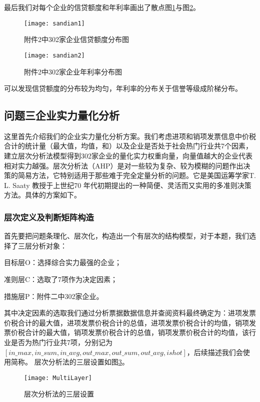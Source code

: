 \documentclass{cumcmthesis}
\begin{document}
    最后我们对每个企业的信贷额度和年利率画出了散点图\ref{sandian1}与图\ref{sandian2}。
    \begin{figure}[H]
        \centering
        \texttt{[image: sandian1]}
        \caption{附件2中302家企业信贷额度分布图}
        \label{sandian1}
    \end{figure}

    \begin{figure}[H]
        \centering
        \texttt{[image: sandian2]}
        \caption{附件2中302家企业年利率分布图}
        \label{sandian2}
    \end{figure}
    可以发现信贷额度的分布较为均匀，年利率的分布关于信誉等级成阶梯分布。

\subsection{问题三企业实力量化分析}
这里首先介绍我们的企业实力量化分析方案。我们考虑进项和销项发票信息中价税合计的统计量（最大值，均值，和）以及企业是否处于社会热门行业共7个因素，建立层次分析法模型得到302家企业的量化实力权重向量，向量值越大的企业代表相对实力越强。层次分析法（AHP）是对一些较为复杂、较为模糊的问题作出决策的简易方法，它特别适用于那些难于完全定量分析的问题。它是美国运筹学家T. L. Saaty 教授于上世纪70 年代初期提出的一种简便、灵活而又实用的多准则决策方法。具体的方案如下。



\subsubsection{层次定义及判断矩阵构造}
首先要把问题条理化、层次化，构造出一个有层次的结构模型，对于本题，我们选择了三层分析对象：

目标层O：选择综合实力最强的企业；

准则层C：选取了7项作为决定因素；

措施层P：附件二中302家企业。

其中决定因素的选取我们通过分析票据数据信息并查阅资料最终确定为：进项发票价税合计的最大值，进项发票价税合计的总值，进项发票价税合计的均值，销项发票价税合计的最大值，销项发票价税合计的总值，销项发票价税合计的均值，该行业是否为热门行业共7项，分别记为$\left[ in\_max,in\_sum,in\_avg,out\_max,out\_sum,out\_avg,ishot \right] $，后续描述我们会使用简称。
层次分析法的三层设置如图\ref{MultiLayer}。
\begin{figure}[H]
    \centering
    \texttt{[image: MultiLayer]}
    \caption{层次分析法的三层设置}
    \label{MultiLayer}
\end{figure}
\end{document}
